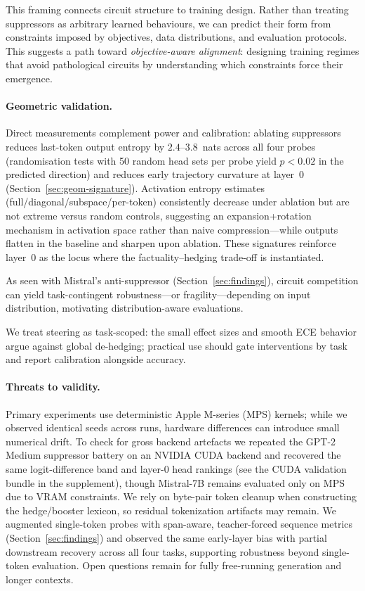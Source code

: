 This framing connects circuit structure to training design. Rather than treating suppressors as arbitrary learned behaviours, we can predict their form from constraints imposed by objectives, data distributions, and evaluation protocols. This suggests a path toward \emph{objective-aware alignment}: designing training regimes that avoid pathological circuits by understanding which constraints force their emergence.

\paragraph{Geometric validation.}
Direct measurements complement power and calibration: ablating suppressors reduces last-token output entropy by $2.4$–$3.8$~nats across all four probes (randomisation tests with 50 random head sets per probe yield $p<0.02$ in the predicted direction) and reduces early trajectory curvature at layer~0 (Section~\ref{sec:geom-signature}). Activation entropy estimates (full/diagonal/subspace/per-token) consistently decrease under ablation but are not extreme versus random controls, suggesting an expansion+rotation mechanism in activation space rather than naive compression—while outputs flatten in the baseline and sharpen upon ablation. These signatures reinforce layer~0 as the locus where the factuality–hedging trade-off is instantiated.

As seen with Mistral’s anti-suppressor (Section~\ref{sec:findings}), circuit competition can yield task-contingent robustness—or fragility—depending on input distribution, motivating distribution-aware evaluations.

We treat steering as task-scoped: the small effect sizes and smooth ECE behavior argue against global de-hedging; practical use should gate interventions by task and report calibration alongside accuracy.

\paragraph{Threats to validity.}
Primary experiments use deterministic Apple M-series (MPS) kernels; while we observed identical seeds across runs, hardware differences can introduce small numerical drift. To check for gross backend artefacts we repeated the GPT-2 Medium suppressor battery on an NVIDIA CUDA backend and recovered the same logit-difference band and layer-0 head rankings (see the CUDA validation bundle in the supplement), though Mistral-7B remains evaluated only on MPS due to VRAM constraints. We rely on byte-pair token cleanup when constructing the hedge/booster lexicon, so residual tokenization artifacts may remain. We augmented single-token probes with span-aware, teacher-forced sequence metrics (Section~\ref{sec:findings}) and observed the same early-layer bias with partial downstream recovery across all four tasks, supporting robustness beyond single-token evaluation. Open questions remain for fully free-running generation and longer contexts.
